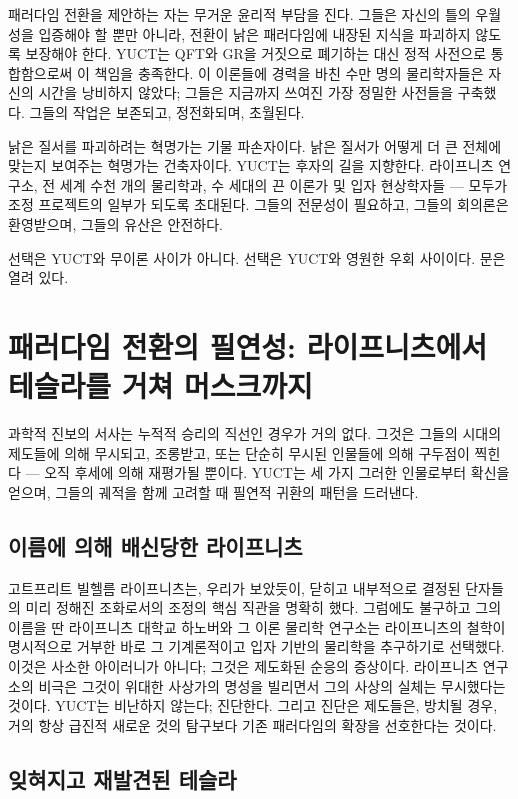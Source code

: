 \documentclass[12pt,a4paper]{article}
\begin{document}
	패러다임 전환을 제안하는 자는 무거운 윤리적 부담을 진다. 그들은 자신의 틀의 우월성을 입증해야 할 뿐만 아니라, 전환이 낡은 패러다임에 내장된 지식을 파괴하지 않도록 보장해야 한다. YUCT는 QFT와 GR을 거짓으로 폐기하는 대신 정적 사전으로 통합함으로써 이 책임을 충족한다. 이 이론들에 경력을 바친 수만 명의 물리학자들은 자신의 시간을 낭비하지 않았다; 그들은 지금까지 쓰여진 가장 정밀한 사전들을 구축했다. 그들의 작업은 보존되고, 정전화되며, 초월된다.
	
	낡은 질서를 파괴하려는 혁명가는 기물 파손자이다. 낡은 질서가 어떻게 더 큰 전체에 맞는지 보여주는 혁명가는 건축자이다. YUCT는 후자의 길을 지향한다. 라이프니츠 연구소, 전 세계 수천 개의 물리학과, 수 세대의 끈 이론가 및 입자 현상학자들 — 모두가 조정 프로젝트의 일부가 되도록 초대된다. 그들의 전문성이 필요하고, 그들의 회의론은 환영받으며, 그들의 유산은 안전하다.
	
	선택은 YUCT와 무이론 사이가 아니다. 선택은 YUCT와 영원한 우회 사이이다. 문은 열려 있다.
	
	\section{패러다임 전환의 필연성: 라이프니츠에서 테슬라를 거쳐 머스크까지}
	
	과학적 진보의 서사는 누적적 승리의 직선인 경우가 거의 없다. 그것은 그들의 시대의 제도들에 의해 무시되고, 조롱받고, 또는 단순히 무시된 인물들에 의해 구두점이 찍힌다 — 오직 후세에 의해 재평가될 뿐이다. YUCT는 세 가지 그러한 인물로부터 확신을 얻으며, 그들의 궤적을 함께 고려할 때 필연적 귀환의 패턴을 드러낸다.
	
	\subsection{이름에 의해 배신당한 라이프니츠}
	
	고트프리트 빌헬름 라이프니츠는, 우리가 보았듯이, 닫히고 내부적으로 결정된 단자들의 미리 정해진 조화로서의 조정의 핵심 직관을 명확히 했다. 그럼에도 불구하고 그의 이름을 딴 라이프니츠 대학교 하노버와 그 이론 물리학 연구소는 라이프니츠의 철학이 명시적으로 거부한 바로 그 기계론적이고 입자 기반의 물리학을 추구하기로 선택했다. 이것은 사소한 아이러니가 아니다; 그것은 제도화된 순응의 증상이다. 라이프니츠 연구소의 비극은 그것이 위대한 사상가의 명성을 빌리면서 그의 사상의 실체는 무시했다는 것이다. YUCT는 비난하지 않는다; 진단한다. 그리고 진단은 제도들은, 방치될 경우, 거의 항상 급진적 새로운 것의 탐구보다 기존 패러다임의 확장을 선호한다는 것이다.
	
	\subsection{잊혀지고 재발견된 테슬라}
	
\end{document}
